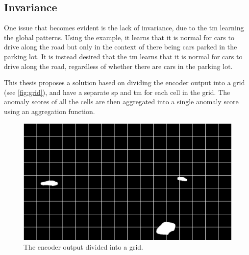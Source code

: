\subsection{Invariance}
One issue that becomes evident is the lack of invariance, due to the \gls*{tm} learning the global patterns. Using the example, it learns that it is normal for cars to drive along the road but only in the context of there being cars parked in the parking lot. It is instead desired that the \gls*{tm} learns that it is normal for cars to drive along the road, regardless of whether there are cars in the parking lot.
\par
This thesis proposes a solution based on dividing the encoder output into a grid (see \autoref{fig:grid}), and have a separate \gls*{sp} and \gls*{tm} for each cell in the grid. The anomaly scores of all the cells are then aggregated into a single anomaly score using an aggregation function.
\begin{figure}[H]
    \centering
    \includegraphics[width=\textwidth]{resources/methodology/car_segmentation_grid.png}
    \caption[Encoder Output Grid]{The encoder output divided into a grid.}
    \label{fig:grid}
\end{figure}
